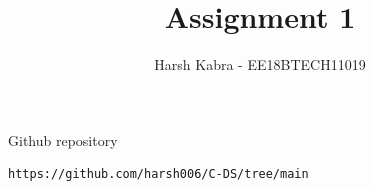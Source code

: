 \documentclass[journal,12pt,twocolumn]{IEEEtran}
\DeclareMathOperator*{\Res}{Res}
\begin{document}
\newtheorem{theorem}{Theorem}[section]
\newtheorem{problem}{Problem}
\newtheorem{proposition}{Proposition}[section]
\newtheorem{lemma}{Lemma}[section]
\newtheorem{corollary}[theorem]{Corollary}
\newtheorem{example}{Example}[section]
\newtheorem{definition}[problem]{Definition}

\newcommand{\BEQA}{\begin{eqnarray}}
\newcommand{\EEQA}{\end{eqnarray}}
\newcommand{\define}{\stackrel{\triangle}{=}}

\raggedbottom
\setlength{\parindent}{0pt}
\providecommand{\mbf}{\mathbf}
\providecommand{\pr}[1]{\ensuremath{\Pr\left(#1\right)}}
\providecommand{\qfunc}[1]{\ensuremath{Q\left(#1\right)}}
\providecommand{\sbrak}[1]{\ensuremath{{}\left[#1\right]}}
\providecommand{\lsbrak}[1]{\ensuremath{{}\left[#1\right.}}
\providecommand{\rsbrak}[1]{\ensuremath{{}\left.#1\right]}}
\providecommand{\brak}[1]{\ensuremath{\left(#1\right)}}
\providecommand{\lbrak}[1]{\ensuremath{\left(#1\right.}}
\providecommand{\rbrak}[1]{\ensuremath{\left.#1\right)}}
\providecommand{\cbrak}[1]{\ensuremath{\left\{#1\right\}}}
\providecommand{\lcbrak}[1]{\ensuremath{\left\{#1\right.}}
\providecommand{\rcbrak}[1]{\ensuremath{\left.#1\right\}}}
\theoremstyle{remark}
\newtheorem{rem}{Remark}
\newcommand{\sgn}{\mathop{\mathrm{sgn}}}
\providecommand{\fourier}{\overset{\mathcal{F}}{ \rightleftharpoons}}
\providecommand{\system}{\overset{\mathcal{H}}{ \longleftrightarrow}}
\newcommand{\solution}{\noindent \textbf{Solution: }}
\newcommand{\cosec}{\,\text{cosec}\,}
\providecommand{\dec}[2]{\ensuremath{\overset{#1}{\underset{#2}{\gtrless}}}}
\newcommand{\myvec}[1]{\ensuremath{\begin{pmatrix}#1\end{pmatrix}}}
\newcommand{\mydet}[1]{\ensuremath{\begin{vmatrix}#1\end{vmatrix}}}
\def\putbox#1#2#3{\makebox[0in][l]{\makebox[#1][l]{}\raisebox{\baselineskip}[0in][0in]{\raisebox{#2}[0in][0in]{#3}}}}
     \def\rightbox#1{\makebox[0in][r]{#1}}
     \def\centbox#1{\makebox[0in]{#1}}
     \def\topbox#1{\raisebox{-\baselineskip}[0in][0in]{#1}}
     \def\midbox#1{\raisebox{-0.5\baselineskip}[0in][0in]{#1}}
\vspace{3cm}
\title{Assignment 1}
\author{Harsh Kabra - EE18BTECH11019}
\maketitle
\bigskip
Github repository
%
\begin{lstlisting}
https://github.com/harsh006/C-DS/tree/main
\end{lstlisting}
\setcounter{figure}{0}
\end{document}
